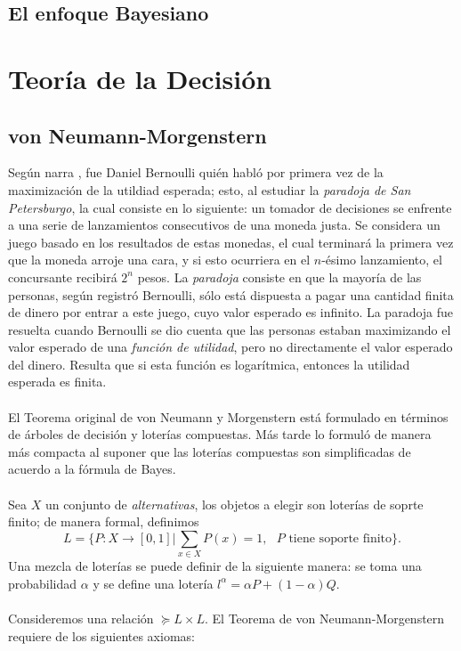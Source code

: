 \documentclass[11pt]{article}
\theoremstyle{plain}
\begin{document}
\subsection{El enfoque Bayesiano}

\section{Teoría de la Decisión}
\subsection{von Neumann-Morgenstern}
Según narra \cite{gilboa2009decision}, fue Daniel Bernoulli quién habló por primera vez de la maximización de la utildiad esperada; esto, al estudiar la \textit{paradoja de San Petersburgo}, la cual consiste en lo siguiente: un tomador de decisiones se enfrente a una serie de lanzamientos consecutivos de una moneda justa. Se considera un juego basado en los resultados de estas monedas, el cual terminará la primera vez que la moneda arroje una cara, y si esto ocurriera en el $n$-ésimo lanzamiento, el concursante recibirá $2^n$ pesos. La \textit{paradoja} consiste en que la mayoría de las personas, según registró Bernoulli, sólo está dispuesta a pagar una cantidad finita de dinero por entrar a este juego, cuyo valor esperado es infinito. La paradoja fue resuelta cuando Bernoulli se dio cuenta que las personas estaban maximizando el valor esperado de una \textit{función de utilidad}, pero no directamente el valor esperado del dinero. Resulta que si esta función es logarítmica, entonces la utilidad esperada es finita. \\
\\
El Teorema original de von Neumann y Morgenstern está formulado en términos de árboles de decisión y loterías compuestas. Más tarde \cite{jensen1967introduction} lo formuló de manera más compacta al suponer que las loterías compuestas son simplificadas de acuerdo a la fórmula de Bayes.\\
\\
Sea $X$ un conjunto de \textit{alternativas}, los objetos a elegir son loterías de soprte finito; de manera formal, definimos
\[ L = \{ P:X \to [0,1] | \sum_{x \in X} P(x) = 1, \textrm{ $P$ tiene soporte finito} \}. \]
Una mezcla de loterías se puede definir de la siguiente manera: se toma una probabilidad $\alpha$ y se define una lotería $l^\alpha = \alpha P + (1- \alpha) Q$.\\
\\
Consideremos una relación  $\succeq L \times L$. El Teorema de von Neumann-Morgenstern requiere de los siguientes axiomas:
\end{document}
